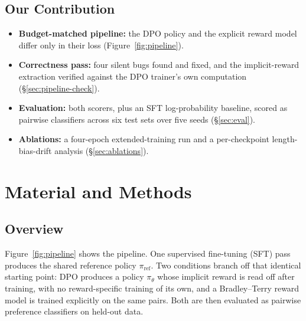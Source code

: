 \documentclass[11pt]{article}
\begin{document}
\subsection{Our Contribution}
\begin{itemize}
  \item \textbf{Budget-matched pipeline:} the DPO policy and the explicit reward model differ
    only in their loss (Figure~\ref{fig:pipeline}).
  \item \textbf{Correctness pass:} four silent bugs found and fixed, and the implicit-reward
    extraction verified against the DPO trainer's own computation (\S\ref{sec:pipeline-check}).
  \item \textbf{Evaluation:} both scorers, plus an SFT log-probability baseline, scored as
    pairwise classifiers across six test sets over five seeds (\S\ref{sec:eval}).
  \item \textbf{Ablations:} a four-epoch extended-training run and a per-checkpoint
    length-bias-drift analysis (\S\ref{sec:ablations}).
\end{itemize}

\section{Material and Methods}

\subsection{Overview}
Figure~\ref{fig:pipeline} shows the pipeline. One supervised fine-tuning (SFT) pass produces the
shared reference policy $\pi_{\mathrm{ref}}$. Two conditions branch off that identical starting
point: DPO produces a policy $\pi_\theta$ whose implicit reward is read off after training, with
no reward-specific training of its own, and a Bradley--Terry reward model is trained explicitly
on the same pairs. Both are then evaluated as pairwise preference classifiers on held-out
data.
\end{document}

